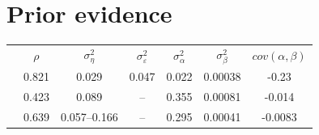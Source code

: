 \section{Prior evidence}
\begin{tabular}{l|c|c|c|c|c|c}

                        & $\rho$ & $\sigma^2_{\eta}$ & $\sigma^2_{\varepsilon}$ & $\sigma^2_{\alpha}$ & $\sigma^2_{\beta}$ & $cov(\alpha,\beta)$ \\
\citet{Guvenen2009}     & 0.821  &   0.029           &    0.047                 &     0.022           &       0.00038      &      -0.23           \\
\citet{Baker1997}       & 0.423  &   0.089           &     --                   &     0.355           &       0.00081      &      -0.014          \\
\citet{Haider2001}      & 0.639  & 0.057--0.166      &     --                   &     0.295           &       0.00041      &      -0.0083
\end{tabular}

